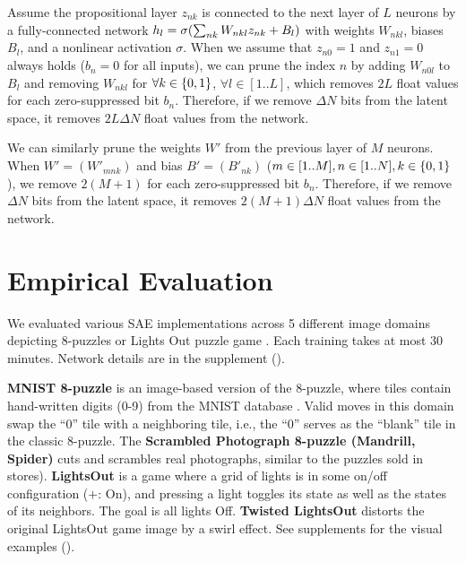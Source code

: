 Assume the propositional layer $z_{nk}$ is connected to the next layer of $L$ neurons
by a fully-connected network $h_l=\sigma{\left(\sum_{nk} W_{nkl}z_{nk}+B_l\right)}$
with weights $W_{nkl}$, biases $B_l$, and a nonlinear activation $\sigma$.
When we assume that $z_{n0}=1$ and $z_{n1}=0$ always holds ($b_n=0$ for all inputs),
we can prune the index $n$
by adding $W_{n0l}$ to $B_l$ and removing $W_{nkl}$ for $\forall k\in{\left\{0,1\right\}}$, $\forall l \in [1..L]$,
which removes $2L$ float values for each zero-suppressed bit $b_n$.
Therefore, if we remove $\Delta N$ bits from the latent space, it removes $2L\Delta N$ float values from the network.
 
We can similarly prune the weights $W'$ from the previous layer of $M$ neurons.
When $W'=(W'_{mnk})$ and bias $B'=(B'_{nk})$ ($m\in[1..M], n\in[1..N], k\in {\left\{0,1\right\}}$),
we remove $2(M+1)$ for each zero-suppressed bit $b_n$.
Therefore, if we remove $\Delta N$ bits from the latent space, it removes $2(M+1)\Delta N$ float values from the network.


\section{Empirical Evaluation}
\label{evaluation}

We evaluated various SAE implementations across 5 different
image domains depicting 8-puzzles or Lights Out puzzle game \cite{lightsout}.
Each training takes at most 30 minutes.
Network details are in the supplement ().

\textbf{MNIST 8-puzzle}
is an image-based version of the 8-puzzle, where tiles contain hand-written digits (0-9) from the  MNIST database \cite{lecun1998gradient}.
Valid moves in this domain swap the ``0'' tile  with a neighboring tile, i.e., the ``0'' serves as the ``blank'' tile in the classic 8-puzzle. 
The \textbf{Scrambled Photograph 8-puzzle (Mandrill, Spider)} cuts and scrambles real photographs, similar to the puzzles sold in stores).
\textbf{LightsOut} \cite{lightsout} is
a game where a grid of lights is in some on/off configuration ($+$: On),
and pressing a light toggles its state as well as the states of its neighbors.
The goal is all lights Off.
\textbf{Twisted LightsOut} distorts the original LightsOut game image by a swirl effect.
See supplements for the visual examples ().

